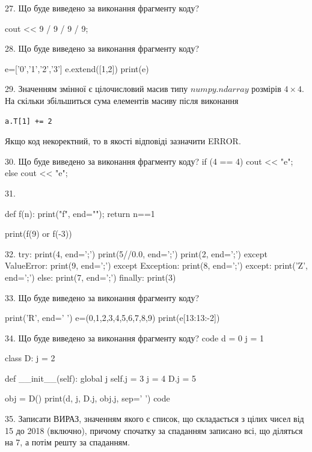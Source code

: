 \documentclass[11pt]{article}
\begin{document}
27. Що буде виведено за виконання фрагменту коду?

cout << 9 / 9 / 9 / 9;


28. Що буде виведено за виконання фрагменту коду?

e=['0','1','2','3']
e.extend([1,2])
print(e)



29. 
Значенням змінної  є цілочисловий масив типу $numpy.ndarray$ розмірів $4{\times}4$. На скільки збільшиться сума елементів масиву  після виконання
\begin{verbatim}
a.T[1] += 2
\end{verbatim}


Якщо код некоректний, то в якості відповіді зазначити ERROR.




30. Що буде виведено за виконання фрагменту коду?
if (4 == 4)
    cout << "e";
else
    cout << "e";



31. 

def f(n):
    print("f", end="");
    return n==1

print(f(9) or f(-3))


32. 
try:
    print(4, end=';')
    print(5//0.0, end=';')
    print(2, end=';')
except ValueError:
    print(9, end=';')
except Exception:
    print(8, end=';')
except:
    print('Z', end=';')
else:
    print(7, end=';')
finally:
    print(3)


33. Що буде виведено за виконання фрагменту коду?

print('R', end=' ')
e=(0,1,2,3,4,5,6,7,8,9)
print(e[13:13:-2])



34. Що буде виведено за виконання фрагменту коду?
code
d = 0
j = 1

class D:
    j = 2
    
    def __init__(self):
global j        self.j = 3
        j = 4
        D.j = 5

obj = D()
print(d, j, D.j, obj.j, sep=' ')
code


35. 
Записати ВИРАЗ, значенням якого є список, що складається з цілих чисел від 15 до 2018 (включно), причому спочатку за спаданням записано всі, що діляться на 7, а потім решту за спаданням.
\end{document}

